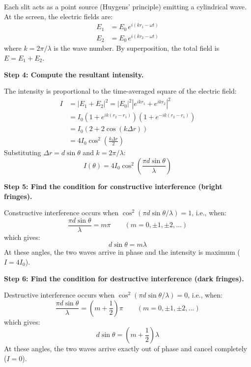 Each slit acts as a point source (Huygens' principle) emitting a cylindrical wave. At the screen, the electric fields are:
\begin{align}
E_1 &= E_0\,e^{i(kr_1 - \omega t)} \\
E_2 &= E_0\,e^{i(kr_2 - \omega t)}
\end{align}
where $k = 2\pi/\lambda$ is the wave number. By superposition, the total field is $E = E_1 + E_2$.

\textbf{Step 4: Compute the resultant intensity.}

The intensity is proportional to the time-averaged square of the electric field:
\begin{align}
I &= |E_1 + E_2|^2 = |E_0|^2|e^{ikr_1} + e^{ikr_2}|^2 \nonumber\\
&= I_0\left(1 + e^{ik(r_2-r_1)}\right)\left(1 + e^{-ik(r_2-r_1)}\right) \nonumber\\
&= I_0\left(2 + 2\cos(k\Delta r)\right) \nonumber\\
&= 4I_0\cos^2\!\left(\frac{k\Delta r}{2}\right)
\end{align}
Substituting $\Delta r = d\sin\theta$ and $k = 2\pi/\lambda$:
\begin{equation}
I(\theta) = 4I_0\cos^2\!\left(\frac{\pi d\sin\theta}{\lambda}\right)
\end{equation}

\textbf{Step 5: Find the condition for constructive interference (bright fringes).}

Constructive interference occurs when $\cos^2(\pi d\sin\theta/\lambda) = 1$, i.e., when:
\begin{equation}
\frac{\pi d\sin\theta}{\lambda} = m\pi \qquad (m = 0, \pm 1, \pm 2, \ldots)
\end{equation}
which gives:
\begin{equation}
d\sin\theta = m\lambda
\end{equation}
At these angles, the two waves arrive in phase and the intensity is maximum ($I = 4I_0$).

\textbf{Step 6: Find the condition for destructive interference (dark fringes).}

Destructive interference occurs when $\cos^2(\pi d\sin\theta/\lambda) = 0$, i.e., when:
\begin{equation}
\frac{\pi d\sin\theta}{\lambda} = \left(m + \frac{1}{2}\right)\pi \qquad (m = 0, \pm 1, \pm 2, \ldots)
\end{equation}
which gives:
\begin{equation}
d\sin\theta = \left(m + \frac{1}{2}\right)\lambda
\end{equation}
At these angles, the two waves arrive exactly out of phase and cancel completely ($I = 0$).

